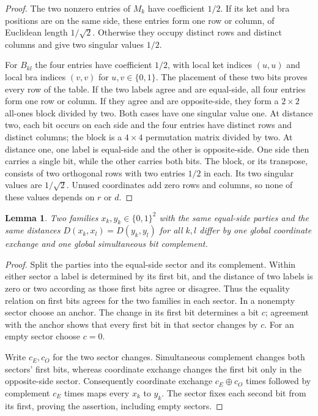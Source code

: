 \documentclass[11pt]{article}
\newtheorem{lemma}[theorem]{Lemma}
\newcommand{\bits}{\{0,1\}}
\begin{document}
\begin{proof}
The two nonzero entries of $M_k$ have coefficient $1/2$. If its ket and
bra positions are on the same side, these entries form one row or column,
of Euclidean length $1/\sqrt2$. Otherwise they occupy distinct rows and
distinct columns and give two singular values $1/2$.

For $B_{kl}$ the four entries have coefficient $1/2$, with local ket
indices $(u,u)$ and local bra indices $(v,v)$ for $u,v\in\bits$.
The placement of these two bits proves every row of the table.
If the two labels agree and are equal-side, all four entries form one
row or column. If they agree and are opposite-side, they form a
$2\times2$ all-ones block divided by two. Both cases have one singular
value one. At distance two, each bit occurs on each side and the four
entries have distinct rows and distinct columns; the block is a
$4\times4$ permutation matrix divided by two. At distance one, one label
is equal-side and the other is opposite-side. One side then carries a
single bit, while the other carries both bits. The block, or its
transpose, consists of two orthogonal rows with two entries $1/2$ in
each. Its two singular values are $1/\sqrt2$. Unused coordinates add
zero rows and columns, so none of these values depends on $r$ or $d$.
\end{proof}

\begin{lemma}\label{lem:labels}
Two families $x_k,y_k\in\bits^2$ with the same equal-side parties and
the same distances $D(x_k,x_l)=D(y_k,y_l)$ for all $k,l$ differ by one
global coordinate exchange and one global simultaneous bit complement.
\end{lemma}

\begin{proof}
Split the parties into the equal-side sector and its complement.
Within either sector a label is determined by its first bit, and the
distance of two labels is zero or two according as those first bits
agree or disagree. Thus the equality relation on first bits agrees for
the two families in each sector. In a nonempty sector choose an anchor.
The change in its first bit determines a bit $c$; agreement with the
anchor shows that every first bit in that sector changes by $c$.
For an empty sector choose $c=0$.

Write $c_E,c_O$ for the two sector changes. Simultaneous complement
changes both sectors' first bits, whereas coordinate exchange changes
the first bit only in the opposite-side sector. Consequently coordinate
exchange $c_E\mathbin\oplus c_O$ times followed by complement $c_E$
times maps every $x_k$ to $y_k$. The sector fixes each second bit from
its first, proving the assertion, including empty sectors.
\end{proof}
\end{document}
